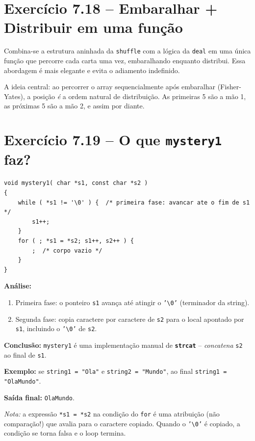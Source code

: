 \documentclass[12pt,a4paper]{article}
\begin{document}
\newpage

\section{Exercício 7.18 -- Embaralhar + Distribuir em uma função}

\begin{respostabox}
Combina-se a estrutura aninhada da \texttt{shuffle} com a lógica da \texttt{deal}
em uma única função que percorre cada carta uma vez, embaralhando enquanto
distribui. Essa abordagem é mais elegante e evita o adiamento indefinido.

A ideia central: ao percorrer o array sequencialmente após embaralhar (Fisher-Yates),
a posição \textit{é} a ordem natural de distribuição. As primeiras 5 são a mão 1,
as próximas 5 são a mão 2, e assim por diante.
\end{respostabox}

\section{Exercício 7.19 -- O que \texttt{mystery1} faz?}

\begin{respostabox}
\begin{lstlisting}
void mystery1( char *s1, const char *s2 )
{
    while ( *s1 != '\0' ) {  /* primeira fase: avancar ate o fim de s1 */
        s1++;
    }
    for ( ; *s1 = *s2; s1++, s2++ ) {
        ;  /* corpo vazio */
    }
}
\end{lstlisting}

\textbf{Análise:}
\begin{enumerate}[noitemsep]
  \item Primeira fase: o ponteiro \texttt{s1} avança até atingir o \texttt{'\textbackslash 0'}
  (terminador da string).
  \item Segunda fase: copia caractere por caractere de \texttt{s2} para o local
  apontado por \texttt{s1}, incluindo o \texttt{'\textbackslash 0'} de \texttt{s2}.
\end{enumerate}

\textbf{Conclusão:} \texttt{mystery1} é uma implementação manual de \textbf{\texttt{strcat}} --
\textit{concatena} \texttt{s2} ao final de \texttt{s1}.

\textbf{Exemplo:} se \texttt{string1 = "Ola"} e \texttt{string2 = "Mundo"}, ao final
\texttt{string1 = "OlaMundo"}.

\textbf{Saída final:} \texttt{OlaMundo}.

\textit{Nota:} a expressão \texttt{*s1 = *s2} na condição do \texttt{for} é uma
atribuição (não comparação!) que avalia para o caractere copiado. Quando o
\texttt{'\textbackslash 0'} é copiado, a condição se torna falsa e o loop termina.
\end{respostabox}
\end{document}
